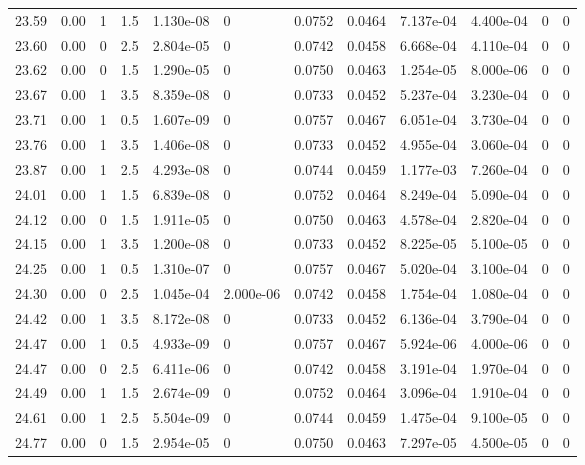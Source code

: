 \documentclass[preview]{standalone}
\begin{document}
{{{{{{{{\begin{tabular}{L{1.2cm}C{1.2cm} C{0.3cm}C{0.5cm} C{1.4cm}C{1.4cm} C{1.4cm}C{1.4cm} C{1.6cm}C{1.6cm} C{1.6cm}C{1.6cm}}
  23.59  &  0.00  & 1     & 1.5 &  1.130e-08  & 0  &  0.0752&   0.0464& 7.137e-04 & 4.400e-04   &  0 & 0  \\ 
  23.60  &  0.00  & 0     & 2.5 &  2.804e-05  & 0  &  0.0742&   0.0458& 6.668e-04 & 4.110e-04   &  0 & 0  \\ 
  23.62  &  0.00  & 0     & 1.5 &  1.290e-05  & 0  &  0.0750&   0.0463& 1.254e-05 & 8.000e-06   &  0 & 0  \\ 
  23.67  &  0.00  & 1     & 3.5 &  8.359e-08  & 0  &  0.0733&   0.0452& 5.237e-04 & 3.230e-04   &  0 & 0  \\ 
  23.71  &  0.00  & 1     & 0.5 &  1.607e-09  & 0  &  0.0757&   0.0467& 6.051e-04 & 3.730e-04   &  0 & 0  \\ 
  23.76  &  0.00  & 1     & 3.5 &  1.406e-08  & 0  &  0.0733&   0.0452& 4.955e-04 & 3.060e-04   &  0 & 0  \\ 
  23.87  &  0.00  & 1     & 2.5 &  4.293e-08  & 0  &  0.0744&   0.0459& 1.177e-03 & 7.260e-04   &  0 & 0  \\ 
  24.01  &  0.00  & 1     & 1.5 &  6.839e-08  & 0  &  0.0752&   0.0464& 8.249e-04 & 5.090e-04   &  0 & 0  \\ 
  24.12  &  0.00  & 0     & 1.5 &  1.911e-05  & 0  &  0.0750&   0.0463& 4.578e-04 & 2.820e-04   &  0 & 0  \\ 
  24.15  &  0.00  & 1     & 3.5 &  1.200e-08  & 0  &  0.0733&   0.0452& 8.225e-05 & 5.100e-05   &  0 & 0  \\ 
  24.25  &  0.00  & 1     & 0.5 &  1.310e-07  & 0  &  0.0757&   0.0467& 5.020e-04 & 3.100e-04   &  0 & 0  \\ 
  24.30  &  0.00  & 0     & 2.5 &  1.045e-04  & 2.000e-06  &  0.0742&   0.0458& 1.754e-04 & 1.080e-04   &  0 & 0  \\ 
  24.42  &  0.00  & 1     & 3.5 &  8.172e-08  & 0  &  0.0733&   0.0452& 6.136e-04 & 3.790e-04   &  0 & 0  \\ 
  24.47  &  0.00  & 1     & 0.5 &  4.933e-09  & 0  &  0.0757&   0.0467& 5.924e-06 & 4.000e-06   &  0 & 0  \\ 
  24.47  &  0.00  & 0     & 2.5 &  6.411e-06  & 0  &  0.0742&   0.0458& 3.191e-04 & 1.970e-04   &  0 & 0  \\ 
  24.49  &  0.00  & 1     & 1.5 &  2.674e-09  & 0  &  0.0752&   0.0464& 3.096e-04 & 1.910e-04   &  0 & 0  \\ 
  24.61  &  0.00  & 1     & 2.5 &  5.504e-09  & 0  &  0.0744&   0.0459& 1.475e-04 & 9.100e-05   &  0 & 0  \\ 
  24.77  &  0.00  & 0     & 1.5 &  2.954e-05  & 0  &  0.0750&   0.0463& 7.297e-05 & 4.500e-05   &  0 & 0  \\ 

\end{tabular}}}}}}}}}
\end{document}
